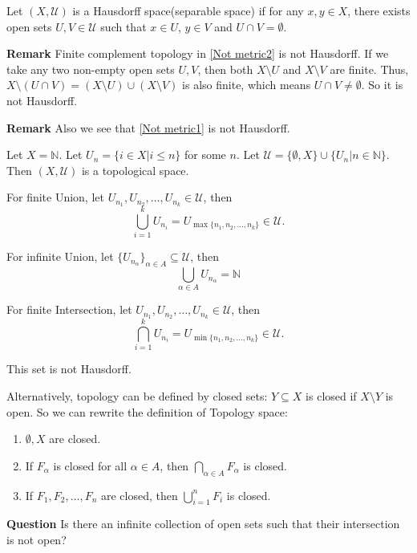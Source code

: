 \documentclass[main.tex]{subfiles}
\begin{document}
\begin{definition}
    Let $(X, \mathcal{U})$ is a Hausdorff space(separable space) if for any $x, y \in X$, there exists open sets $U, V \in \mathcal{U}$ such that $x \in U$, $y \in V$ and $U \cap V = \emptyset$. 
\end{definition}
\par \noindent \textbf{Remark} Finite complement topology in \ref{Not metric2} is not Hausdorff. If we take any two non-empty open sets $U, V$, then both $X \setminus U$ and $X \setminus V$ are finite. Thus, $X \setminus (U \cap V) = (X \setminus U) \cup (X \setminus V)$ is also finite, which means $U \cap V \neq \emptyset$. So it is not Hausdorff. 
\par \noindent \textbf{Remark} Also we see that \ref{Not metric1} is not Hausdorff. 

\begin{example}
    Let $X = \mathbb{N}$. Let $U_n = \{i\in X| i\le n\}$ for some $n$. Let $\mathcal{U} = \{\emptyset, X\} \cup \{U_n | n \in \mathbb{N}\}$. Then $(X, \mathcal{U})$ is a topological space. 
\par For finite Union, let $U_{n_1}, U_{n_2}, \ldots, U_{n_k} \in \mathcal{U}$, then 
    \begin{equation}
        \bigcup_{i=1}^k U_{n_i} = U_{\max\{n_1, n_2, \ldots, n_k\}} \in \mathcal{U}.
    \end{equation}
\par For infinite Union, let $\{U_{n_{\alpha}}\}_{\alpha \in A} \subseteq \mathcal{U}$, then 
    \begin{equation}
        \bigcup_{\alpha \in A} U_{n_{\alpha}} = \mathbb{N}
    \end{equation}
\par For finite Intersection, let $U_{n_1}, U_{n_2}, \ldots, U_{n_k} \in \mathcal{U}$, then 
    \begin{equation}
        \bigcap_{i=1}^k U_{n_i} = U_{\min\{n_1, n_2, \ldots, n_k\}} \in \mathcal{U}.
    \end{equation}
\par This set is not Hausdorff. 
\end{example}

\par Alternatively, topology can be defined by closed sets: $Y \subseteq X$ is closed if $X\setminus Y$ is open. So we can rewrite the definition of Topology space: 
\begin{enumerate}
    \item $\emptyset, X$ are closed.
    \item If $F_{\alpha}$ is closed for all $\alpha \in A$, then $\bigcap_{\alpha \in A} F_{\alpha}$ is closed.
    \item If $F_1, F_2, \ldots, F_n$ are closed, then $\bigcup_{i=1}^n F_i$ is closed.
\end{enumerate}
\par \noindent \textbf{Question} Is there an infinite collection of open sets such that their intersection is not open? 
\end{document}
